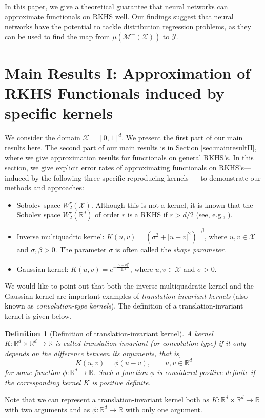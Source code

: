 \documentclass{article}
\def\RR{\mathbb R}
\numberwithin{equation}{section}
\newtheorem{definition}[theorem]{Definition}
\begin{document}
In this paper, we give a theoretical guarantee that neural networks can approximate functionals on RKHS well. Our findings suggest that neural networks have the potential to tackle distribution regression problems, as they can be used to find the map from $\mu(\mathcal{M}^+(\mathcal{X}))$ to $\mathcal{Y}$. 

\section{Main Results I: Approximation of RKHS Functionals induced by specific kernels}\label{sec:mainresultI}

We consider the domain  $\mathcal{X} = [0,1]^d$. We present the first part of our main results here.
The second part of our main results is in Section \ref{sec:mainresultII}, where we give approximation results for functionals on general RKHS's. 
In this section, we give explicit error rates of approximating functionals on RKHS's--- induced by the following three specific reproducing kernels --- to demonstrate our methods and approaches: 
\begin{itemize}
\item Sobolev space $W^r_2(\mathcal{X})$. Although this is not a kernel, it is known that the Sobolev space $W^r_2(\RR^d)$ of order $r$ is a RKHS if $r>d/2$ (see, e.g., \citep{brezis2011functional, wainwright2019high}). 

\item Inverse multiquadric kernel: $K(u,v) = (\sigma^2 + |u-v|^2)^{-\beta}$, where $u,v \in \mathcal{X}$ and $\sigma, \beta >0$. The parameter $\sigma$ is often called the {\it shape parameter}.

\item Gaussian kernel: $K(u,v)= e^{-\frac{|u-v|^2}{2\sigma^2}}$, where $u,v \in \mathcal{X}$ and $\sigma>0$.



\end{itemize} 

We would like to point out that both the inverse multiquadratic kernel and the Gaussian kernel are important examples of {\it translation-invariant kernels} (also known as {\it convolution-type kernels}).  
The definition of a translation-invariant kernel is given below. 

\begin{definition}[Definition of translation-invariant kernel]\label{def:translation}
    A kernel $K:\RR^d \times \RR^d \rightarrow \RR$ is called translation-invariant (or convolution-type) if it only depends on the difference between its arguments, that is,
    \begin{equation}\label{eq:translation}
        K(u,v) = \phi(u-v), \qquad  u,v \in \RR^d
    \end{equation}
    for some function $\phi:\RR^d \rightarrow \RR$. Such a function $\phi$ is considered positive definite if the corresponding kernel $K$ is positive definite.
\end{definition}
Note that we can represent a translation-invariant kernel both as  $K:\RR^d \times \RR^d \rightarrow \RR$ with two arguments and as $\phi:\RR^d \rightarrow \RR$ with only one argument.
\end{document}

